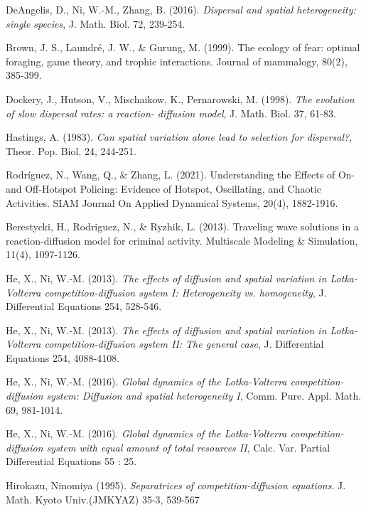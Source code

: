 \documentclass[10pt]{amsart}
\theoremstyle{definition}
\begin{document}
\begin{thebibliography}{}
   
 DeAngelis, D., Ni, W.-M., Zhang,  B. (2016).
\newblock\emph{Dispersal and spatial heterogeneity: single species}, 
\newblock J. Math. Biol. 72, 239-254.   
  
Brown, J. S., Laundré, J. W., \& Gurung, M. (1999). The ecology of fear: optimal foraging, game theory, and trophic interactions. Journal of mammalogy, 80(2), 385-399. 
 
 
  Dockery, J., Hutson, V., Mischaikow, K., Pernarowski, M. (1998).
\newblock\emph{The evolution of slow dispersal rates: a reaction- diffusion model},
\newblock J. Math. Biol. 37, 61-83. 
  
  Hastings, A. (1983).
\newblock\emph{Can spatial variation alone lead to selection for dispersal?}, 
\newblock Theor. Pop. Biol. 24, 244-251.
  
  Rodríguez, N., Wang, Q., \& Zhang, L. (2021). Understanding the Effects of On-and Off-Hotspot Policing: Evidence of Hotspot, Oscillating, and Chaotic Activities. SIAM Journal On Applied Dynamical Systems, 20(4), 1882-1916.
  
Berestycki, H., Rodriguez, N., \& Ryzhik, L. (2013). Traveling wave solutions in a reaction-diffusion model for criminal activity. Multiscale Modeling \& Simulation, 11(4), 1097-1126.  
  
  
  
  
  He, X., Ni, W.-M. (2013).
\newblock\emph{The effects of diffusion and spatial variation in Lotka-Volterra competition-diffusion system I: Heterogeneity vs. homogeneity},
\newblock J. Differential Equations 254, 528-546.  
 
 He, X., Ni, W.-M.  (2013).
\newblock\emph{The effects of diffusion and spatial variation in Lotka-Volterra competition-diffusion system II: The general case}, 
\newblock J. Differential Equations 254, 4088-4108. 
  
 He, X., Ni, W.-M. (2016).
\newblock\emph{Global dynamics of the Lotka-Volterra competition-diffusion system: Diffusion and spatial heterogeneity I},
\newblock Comm. Pure. Appl. Math. 69, 981-1014.
  
 He, X., Ni, W.-M. (2016).
\newblock\emph{Global dynamics of the Lotka-Volterra competition-diffusion system with equal amount of total resources II},
\newblock Calc. Var. Partial Differential Equations 55 : 25. 
  
   Hirokazu, Ninomiya (1995).
  \newblock\emph{Separatrices of competition-diffusion equations}.
  \newblock J. Math. Kyoto Univ.(JMKYAZ) 35-3, 539-567
  

\end{thebibliography}
\end{document}
